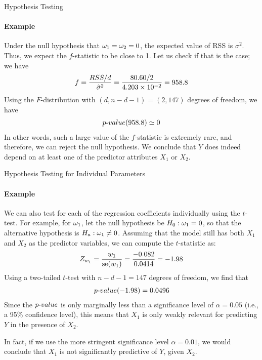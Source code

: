 \begin{frame}{Hypothesis Testing}
\framesubtitle{Example}

	Under the null hypothesis that $\omega_1 = \omega_2 = 0$,
    the expected value of RSS is $\sigma^2$. Thus, we expect the
    $f$-statistic to be close to 1. Let us check if that is the case; we
    have
    \begin{align*}
        f = \frac{RSS/d}{\hat{\sigma}^2} = \frac{80.60/2}{4.203 \times
        10^{-2}} = 958.8
    \end{align*}
    Using the $F$-distribution with $(d,n-d-1) = (2,147)$ degrees of freedom, we
    have
    \begin{align*}
        {p\text{-}value}(958.8) \simeq 0
    \end{align*}
    In other words, such a large value of the $f$-statistic is extremely
    rare, and therefore, we can reject the null hypothesis. We conclude that $Y$
    does indeed depend on at least one of the predictor attributes $X_1$
    or $X_2$.

\end{frame}
%
\begin{frame}{Hypothesis Testing for Individual Parameters}
\framesubtitle{Example}
    We can also test for each of the regression coefficients
    individually using the $t$-test. For example, for $\omega_1$, let the
    null hypothesis be $H_0: \omega_1 = 0$, so that the alternative
    hypothesis is $H_a: \omega_1 \ne 0$. Assuming that the model still has
    both $X_1$ and $X_2$ as the predictor variables, we can compute the
    $t$-statistic as: %
    \begin{align*}
        Z_{w_1} = \frac{w_1}{\operatorname{se}(w_1)}  =
        \frac{-0.082}{0.0414} = -1.98
    \end{align*}
    Using a two-tailed $t$-test with $n-d-1=147$ degrees of freedom, we
    find that
    \begin{align*}
        {p\text{-}value}(-1.98) = 0.0496
    \end{align*}
    Since the ${p\text{-}value}$ is only marginally less than a significance
    level of $\alpha=0.05$ (i.e., a 95\% confidence level), 
    this means that $X_1$ is only weakly 
    relevant for predicting $Y$ in the
    presence of $X_2$. 

	\medskip

	In fact, if we use the more stringent
    significance level $\alpha=0.01$, 
    we would conclude that $X_1$ is not significantly
    predictive of $Y$, given $X_2$.
\end{frame}

